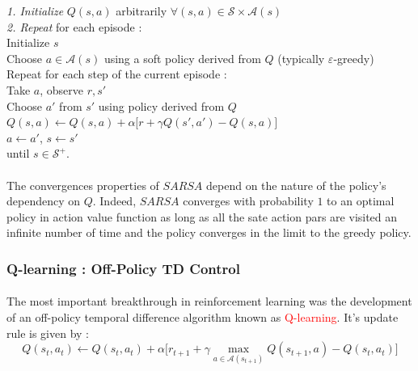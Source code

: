 \documentclass[a4paper]{article}
\begin{document}
{{{{					
					{
						\begin{algorithm}[H]
	 					\SetAlgoLined
						\LinesNumbered
						\emph{\textsf{1. Initialize}} $Q(s,a)$ arbitrarily $\forall (s,a)\in\mathcal{S}\times\mathcal{A}(s)$ \\
						\BlankLine
						\BlankLine
						\emph{\textsf{2. Repeat}} for each episode : \\
						\Indp \Indp 
							Initialize $s$ \\
							Choose $a\in\mathcal{A}(s)$ using a soft policy derived from $Q$ (typically $\varepsilon$-greedy) \\
							Repeat for each step of the current episode :   \\
							\Indp \Indp 
								Take $a$, observe $r,s'$ \\
								Choose $a'$ from $s'$ using policy derived from $Q$ 
								$ Q(s,a) \longleftarrow Q(s,a) + \alpha\big[ r + \gamma Q(s',a') - Q(s,a) \big]$ \\
								$a\leftarrow a'$, $s\leftarrow s' $ \\
								
							\Indm \Indm 
						until $s\in\mathcal{S}^+$.
						\Indm \Indm 
						\end{algorithm}
					}
					
					\paragraph{} The convergences properties of $SARSA$ depend on the nature of the policy's dependency on $Q$. Indeed, $SARSA$ converges with probability $1$ to an optimal policy in action value function as long as all the sate action pars are visited an infinite number of time and the policy converges in the limit to the greedy policy. 
				}
			
				\subsubsection{Q-learning : Off-Policy TD Control}
				{
					\paragraph{} The most important breakthrough in reinforcement learning was the development of an off-policy temporal difference algorithm known as \textcolor{red}{Q-learning}. It's update rule is given by : 
					\begin{equation}
						Q(s_t,a_t) \leftarrow Q(s_t,a_t) + \alpha \big[ r_{t+1} + \gamma \max_{a\in\mathcal{A}(s_{t+1})} Q(s_{t+1},a) - Q(s_t,a_t) \big]
					\end{equation}
					
}}}}
\end{document}
